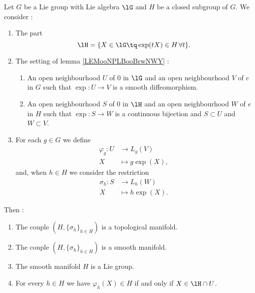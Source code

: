 \begin{propositionDef}	\label{PROPooZIKNooEdCqRB}
	Let \( G\) be a Lie group with Lie algebra \( \lG\) and \( H\) be a closed subgroup of \( G\). We consider :
	\begin{enumerate}

		\item
		      The part
		      \begin{equation}		\label{EQooBROMooIQArCm}
			      \lH=\{ X\in\lG\tq \exp(tX)\in H\,\forall t \}.
		      \end{equation}
		\item
		      The setting of lemma \ref{LEMooNPLBooBrwNWY} :
		      \begin{enumerate}
			      \item
			            An open neighbourhood \( U\) of \( 0\) in \( \lG\) and an open neighbourhood \( V\) of \( e\) in \( G\) such that \(\exp \colon U\to V  \) is a smooth diffeomorphism.
			      \item
			            An open neighbourhood \( S\) of \( 0\) in \( \lH\) and an open neighbourhood \( W\) of \( e\) in \( H\) such that \(\exp \colon S\to W  \) is a continuous bijection and \( S\subset U\) and \( W\subset V\).
		      \end{enumerate}
		\item
		      For each \( g\in G\) we define
		      \begin{equation}
			      \begin{aligned}
				      \varphi_g\colon U & \to L_g(V)        \\
				      X                 & \mapsto g\exp(X),
			      \end{aligned}
		      \end{equation}
		      and, when \( h\in H\) we consider the restriction
		      \begin{equation}
			      \begin{aligned}
				      \sigma_h\colon S & \to L_h(W)        \\
				      X                & \mapsto h\exp(X).
			      \end{aligned}
		      \end{equation}
	\end{enumerate}
	Then :
	\begin{enumerate}
		\item		\label{ITEMooLNBGooFoqGxF}
		      The couple \( (H,\{ \sigma_h \}_{h\in H})\) is a topological manifold.
		\item		\label{ITEMooZRGGooDeLHeg}
		      The couple \( (H,\{ \sigma_h \}_{h\in H})\) is a smooth manifold.
		\item	\label{ITEMooEZRLooHEsGkB}
		      The smooth manifold \( H\) is a Lie group.
		\item	\label{ITEMooUYJSooNjfsLQ}
		      For every \( h\in H\) we have \( \varphi_h(X)\in H\) if and only if \( X\in \lH\cap U\).
	\end{enumerate}


\end{propositionDef}
